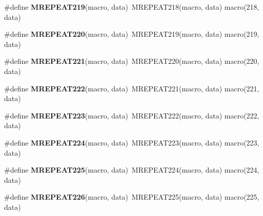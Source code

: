 \begin{DoxyCompactItemize}
\item 
\hypertarget{group__group__xmega__utils__mrepeat_gad3ad7ca1333f24fd50e250e28d312509}{\#define {\bfseries M\-R\-E\-P\-E\-A\-T219}(macro, data)~M\-R\-E\-P\-E\-A\-T218(macro, data)   macro(218, data)}\label{group__group__xmega__utils__mrepeat_gad3ad7ca1333f24fd50e250e28d312509}

\item 
\hypertarget{group__group__xmega__utils__mrepeat_ga87b159389edf9a6b6f2e0fcf17139964}{\#define {\bfseries M\-R\-E\-P\-E\-A\-T220}(macro, data)~M\-R\-E\-P\-E\-A\-T219(macro, data)   macro(219, data)}\label{group__group__xmega__utils__mrepeat_ga87b159389edf9a6b6f2e0fcf17139964}

\item 
\hypertarget{group__group__xmega__utils__mrepeat_ga8b900659b10dcbf3db345acef26f242c}{\#define {\bfseries M\-R\-E\-P\-E\-A\-T221}(macro, data)~M\-R\-E\-P\-E\-A\-T220(macro, data)   macro(220, data)}\label{group__group__xmega__utils__mrepeat_ga8b900659b10dcbf3db345acef26f242c}

\item 
\hypertarget{group__group__xmega__utils__mrepeat_ga8a7acdd582f6480ff0ba12258858670f}{\#define {\bfseries M\-R\-E\-P\-E\-A\-T222}(macro, data)~M\-R\-E\-P\-E\-A\-T221(macro, data)   macro(221, data)}\label{group__group__xmega__utils__mrepeat_ga8a7acdd582f6480ff0ba12258858670f}

\item 
\hypertarget{group__group__xmega__utils__mrepeat_ga6d10ab8a91d39e5445dd73345376b1c0}{\#define {\bfseries M\-R\-E\-P\-E\-A\-T223}(macro, data)~M\-R\-E\-P\-E\-A\-T222(macro, data)   macro(222, data)}\label{group__group__xmega__utils__mrepeat_ga6d10ab8a91d39e5445dd73345376b1c0}

\item 
\hypertarget{group__group__xmega__utils__mrepeat_ga3b9133ba29da0660d2b743093e68538a}{\#define {\bfseries M\-R\-E\-P\-E\-A\-T224}(macro, data)~M\-R\-E\-P\-E\-A\-T223(macro, data)   macro(223, data)}\label{group__group__xmega__utils__mrepeat_ga3b9133ba29da0660d2b743093e68538a}

\item 
\hypertarget{group__group__xmega__utils__mrepeat_ga7a35ac51829f1231cd1f15d17bd69e90}{\#define {\bfseries M\-R\-E\-P\-E\-A\-T225}(macro, data)~M\-R\-E\-P\-E\-A\-T224(macro, data)   macro(224, data)}\label{group__group__xmega__utils__mrepeat_ga7a35ac51829f1231cd1f15d17bd69e90}

\item 
\hypertarget{group__group__xmega__utils__mrepeat_ga4a34529f9fa47949482c0d37bdacd3c8}{\#define {\bfseries M\-R\-E\-P\-E\-A\-T226}(macro, data)~M\-R\-E\-P\-E\-A\-T225(macro, data)   macro(225, data)}\label{group__group__xmega__utils__mrepeat_ga4a34529f9fa47949482c0d37bdacd3c8}


\end{DoxyCompactItemize}

